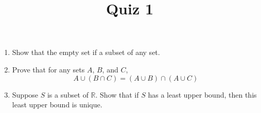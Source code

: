 \documentclass[10pt,a4paper,oneside]{book}
\title{Quiz 1}
\author{}
\date{}
\begin{document}
\maketitle

\begin{enumerate}
    \item Show that the empty set if a subset of any set.
    \item Prove that for any sets $A$, $B$, and $C$,
    \[ A\cup (B\cap C) = (A\cup B)\cap (A\cup C)\]

    \item Suppose $S$ is a subset of $\mathbb{R}$. Show that if $S$ has a least upper bound, then this least upper bound is unique.
\end{enumerate}
\end{document}
